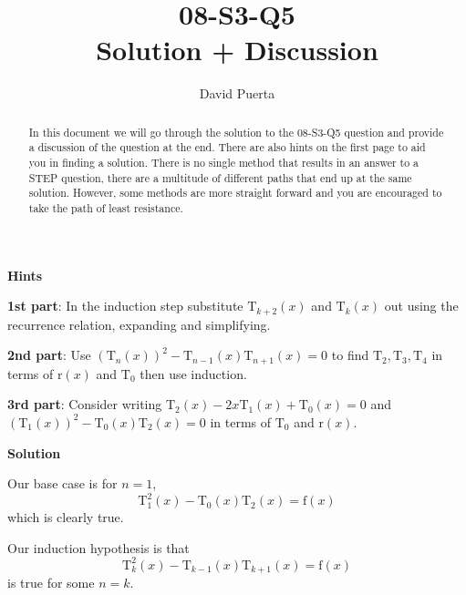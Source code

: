 \documentclass{article}
\title{08-S3-Q5 \\ Solution + Discussion}
\author{David Puerta}
\date{}
\begin{document}
\maketitle

\begin{abstract}
    \noindent In this document we will go through the solution to the 08-S3-Q5 question and provide a discussion of the question at the end. There are also hints on the first page to aid you in finding a solution. There is no single method that results in an answer to a STEP question, there are a multitude of different paths that end up at the same solution. However, some methods are more straight forward and you are encouraged to take the path of least resistance.  
\end{abstract}

\vspace{2cm}

\begin{center}
    \textbf{Hints}
\end{center}

\textbf{1st part}: In the induction step substitute $\mathrm{T}_{k+2}(x)$ and $\mathrm{T}_{k}(x)$ out using the recurrence relation, expanding and simplifying.

\vspace{1cm}

\textbf{2nd part}: Use $\left(\mathrm{T}_n(x)\right)^2 - \mathrm{T}_{n-1}(x) \mathrm{T}_{n+1}(x) = 0$ to find $\mathrm{T}_2,\mathrm{T}_3,\mathrm{T}_4$ in terms of $\mathrm{r}(x)$ and $\mathrm{T}_0$ then use induction.

\vspace{1cm}

\textbf{3rd part}: Consider writing $\mathrm{T}_{2}(x) -2x \mathrm{T}_{1}(x) + \mathrm{T}_{0}(x) =0$ and $\left(\mathrm{T}_1(x)\right)^2 - \mathrm{T}_{0}(x) \mathrm{T}_{2}(x)=0$
in terms of $\mathrm{T}_0$ and $\mathrm{r}(x)$.

\newpage

\begin{center}
    \textbf{Solution}
\end{center}

\vspace{0.5cm}

Our base case is for $n=1$,
\[
\mathrm{T}_1^2(x)-\mathrm{T}_0(x)\mathrm{T}_2(x) = \mathrm{f}(x)
\]
which is clearly true.\par

\quad Our induction hypothesis is that 
\[
\mathrm{T}_k^2(x)-\mathrm{T}_{k-1}(x)\mathrm{T}_{k+1}(x) = \mathrm{f}(x)
\]
is true for some $n=k$.\par
\end{document}
